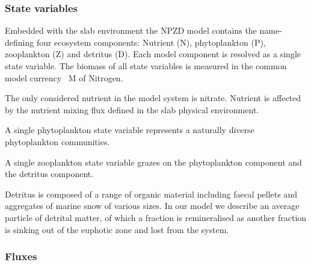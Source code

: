 \documentclass[journal abbreviations, manuscript]{copernicus}
\begin{document}
\subsubsection{State variables}
Embedded with the slab environment the NPZD model contains the name-defining four ecosystem components: Nutrient (N), phytoplankton (P), zooplankton (Z) and detritus (D). 
Each model component is resolved as a single state variable. The biomass of all state variables is measured in the common model currency \unit{\mu M} of Nitrogen.

The only considered nutrient in the model system is nitrate. Nutrient is affected by the nutrient mixing flux defined in the slab physical environment.

A single phytoplankton state variable represents a naturally diverse phytoplankton communities. 

A single zooplankton state variable grazes on the phytoplankton component and the detritus component.

Detritus is composed of a range of organic material including faecal pellets and aggregates of marine snow of various sizes. In our model we describe an average particle of detrital matter, of which a fraction is remineralised as another fraction is sinking out of the euphotic zone and lost from the system. 



\subsubsection{Fluxes} \label{Section:SlabNPZD_Fluxes}

\end{document}

